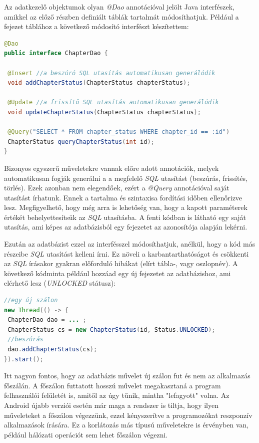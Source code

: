 \documentclass[12pt,a4paper]{article}
\begin{document}
	Az adatkezelő objektumok olyan \textit{@Dao} annotációval jelölt Java interfészek, amikkel az előző részben definiált táblák tartalmát módosíthatjuk. Például a fejezet táblához a következő módosító interfészt készítettem:
	
	\begin{lstlisting}[language=Java]
@Dao
public interface ChapterDao {
	
 @Insert //a beszúró SQL utasítás automatikusan generálódik
 void addChapterStatus(ChapterStatus chapterStatus);
	
 @Update //a frissítő SQL utasítás automatikusan generálódik
 void updateChapterStatus(ChapterStatus chapterStatus);
	
 @Query("SELECT * FROM chapter_status WHERE chapter_id == :id")
 ChapterStatus queryChapterStatus(int id);
}
	\end{lstlisting}

	Bizonyos egyszerű műveletekre vannak előre adott annotációk, melyek automatikusan fogják generálni a a megfelelő \textit{SQL} utasítást (beszúrás, frissítés, törlés). Ezek azonban nem elegendőek, ezért a \textit{@Query} annotációval saját utasítást írhatunk. Ennek a tartalma és szintaxisa fordítási időben ellenőrizve lesz. Megfigyelhető, hogy még arra is lehetőség van, hogy a kapott paraméterek értékét behelyettesítsük az \textit{SQL} utasításba. A fenti kódban is látható egy saját utasítás, ami képes az adatbázisból egy fejezetet az azonosítója alapján lekérni.

	Ezután az adatbázist ezzel az interfésszel módosíthatjuk, anélkül, hogy a kód más részeibe \textit{SQL} utasítást kelleni írni. Ez növeli a karbantarthatóságot és 
	csökkenti az \textit{SQL} írásakor gyakran előforduló hibákat (elírt tábla-, vagy oszlopnév). A következő kódminta például hozzáad egy új fejezetet az adatbázishoz, ami elérhető lesz (\textit{UNLOCKED} státusz):
	
	\begin{lstlisting}[language=Java]
//egy új szálon
new Thread(() -> {
 ChapterDao dao = ... ;
 ChapterStatus cs = new ChapterStatus(id, Status.UNLOCKED);
 //beszúrás
 dao.addChapterStatus(cs);
}).start();
	\end{lstlisting}
	
	Itt nagyon fontos, hogy az adatbázis művelet új szálon fut és nem az alkalmazás főszálán. A főszálon futtatott hosszú művelet megakasztaná a program felhasználói felületét is, amitől az úgy tűnik, mintha "lefagyott" volna. Az Android újabb verziói esetén már maga a rendszer is tiltja, hogy ilyen műveleteket 
	a főszálon végezzünk, ezzel kényszerítve a programozókat reszponzív alkalmazások írására. Ez a korlátozás más típusú műveletekre is érvényben van, például hálózati operációt sem lehet főszálon végezni.
	
\end{document}
